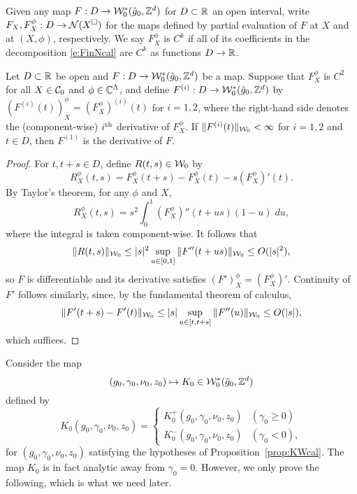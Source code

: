 Given any map $F : D \rightarrow \mathcal{W}^*_0(\tilde{g}_0, { {{\mathbb Z}}^d })$ for $D \subset {\mathbb R}$ an open interval,
write $F_X, F^\phi_X : D \rightarrow \mathcal{N}(X^\square)$ for the
maps defined by partial evaluation of $F$ at $X$ and at
$(X, \phi)$, respectively. We say $F^\phi_X$ is $C^k$
if all of its coefficients in the decomposition \eqref{e:FinNcal}
are $C^k$ as functions $D \rightarrow {\mathbb R}$.

\begin{lemma}
\label{lem:smoothness}
Let $D \subset {\mathbb R}$ be open and $F : D \rightarrow \mathcal{W}^*_0(\tilde{g}_0, { {{\mathbb Z}}^d })$ be a map.
Suppose that $F^\phi_X$ is $C^2$ for all $X \in \mathcal{C}_0$
and $\phi \in \mathbb{C}^\Lambda$, and define 
$F^{(i)} : D \rightarrow \mathcal{W}^*_0(\tilde{g}_0, { {{\mathbb Z}}^d })$ by $(F^{(i)}(t))^\phi_X = (F^\phi_X)^{(i)}(t)$ for $i = 1, 2$,
where the right-hand side denotes the (component-wise) $i^{\rm th}$
derivative of $F^\phi_X$.
If $\|F^{(i)}(t)\|_{\mathcal{W}_0} < \infty$ for $i = 1, 2$ and $t \in D$, then 
$F^{(1)}$ is the derivative of $F$.
\end{lemma}

\begin{proof}
For $t, t + s \in D$, define $R(t, s) \in \mathcal{W}_0$ by
\begin{equation}
R^\phi_X(t, s) = F^\phi_X(t + s) - F^\phi_X(t) - s (F^\phi_X)'(t).
\end{equation}
By Taylor's theorem, for any $\phi$ and $X$,
\begin{equation}
R^\phi_X(t, s) = s^2 \int_0^1 (F^\phi_X)''(t + u s) (1 - u) \; du,
\end{equation}
where the integral is taken component-wise.
It follows
that
\begin{equation}
\|R(t, s)\|_{\mathcal{W}_0}
  \le |s|^2 \sup_{u\in[0,1]} \|F''(t+us)\|_{\mathcal{W}_0}
  \le O(|s|^2),
\end{equation}
so $F$ is differentiable 
and its derivative satisfies $(F')^\phi_X = (F^\phi_X)'$.
Continuity of $F'$ follows similarly, since, by the
fundamental theorem of calculus,
\begin{equation}
\|F'(t+s) - F'(t)\|_{\mathcal{W}_0}
  \le
|s| \sup_{u\in[t,t+s]} \|F''(u)\|_{\mathcal{W}_0}
  \le
O(|s|),
\end{equation}
which suffices.
\end{proof}

Consider the map
\begin{equation}
(g_0, \gamma_0, \nu_0, z_0) \mapsto K_0 \in \mathcal{W}^*_0(\tilde{g}_0, { {{\mathbb Z}}^d })
\end{equation}
defined by
\begin{equation}
\label{e:K0def}
K_0(g_0, \gamma_0, \nu_0, z_0) =
\begin{cases}
K^+_0(g_0, \gamma_0, \nu_0, z_0)
  & (\gamma_0 \geq 0) \\
K^-_0(g_0, \gamma_0, \nu_0, z_0)
  & (\gamma_0 < 0),
\end{cases}
\end{equation}
for $(g_0, \gamma_0, \nu_0, z_0)$ satisfying the hypotheses
of Proposition~\ref{prop:KWcal}.
The map $K_0$ is in fact analytic away from $\gamma_0 = 0$.
However, we only prove the following, which is what we need later.

